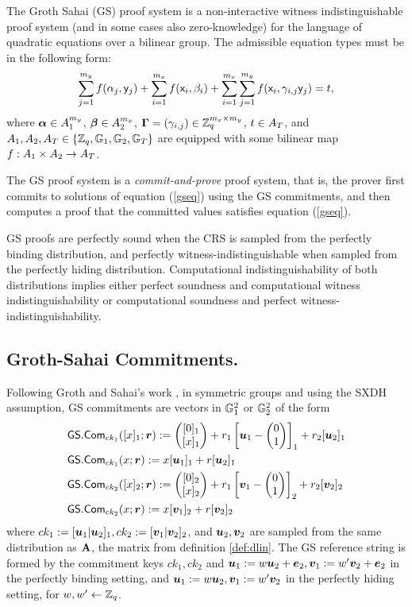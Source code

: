 
The Groth Sahai (GS) proof system is a non-interactive witness indistinguishable proof system (and in some cases also zero-knowledge) for the language of quadratic equations over a bilinear group. The admissible equation types must be in the following form:
\begin{equation}\label{gseq}
\sum_{j=1}^{m_y} f(\alpha_j, \mathsf{y}_j)+\sum_{i=1}^{m_x} f(\mathsf{x}_i, \beta_i)+\sum_{i=1}^{m_x} \sum_{j=1}^{m_y}  f(\mathsf{x}_i,\gamma_{i,j} \mathsf{y}_j)=t,
\end{equation}
 where $\boldsymbol \alpha  \in A_1^{m_y}$, $\boldsymbol \beta  \in A_2^{m_x}$, $\mathbf{{\Gamma}}=(\gamma_{i,j}) \in \mathbb{Z}_q^{m_x\times m_y}$, $t \in A_T$, and $A_1,A_2,A_T\in\{\mathbb{Z}_q,\mathbb{G}_1,\mathbb{G}_2, \mathbb{G}_T\}$ 
are equipped with some bilinear map $f:A_1\times A_2 \rightarrow A_T$.

The GS proof system is a \emph{commit-and-prove} proof system, that is, the prover first commits to solutions
of equation (\ref{gseq}) using the GS commitments, and then computes a proof that the committed values satisfies equation (\ref{gseq}).

GS proofs are perfectly sound when the CRS is sampled from the perfectly binding distribution, and perfectly witness-indistinguishable when sampled from the perfectly hiding distribution. Computational indistinguishability of  both distributions implies either perfect soundness and computational witness indistinguishability or computational soundness and perfect witness-indistinguishability.

\subsection{Groth-Sahai Commitments.}
Following Groth and Sahai's work \cite{EC:GroSah08}, in symmetric groups and using the SXDH assumption, GS commitments are vectors in $\mathbb{G}^2_1$ or $\mathbb{G}_2^2$ of the form
\begin{align*}
&{\mathsf{GS}}.\mathsf{Com}_{ck_1}([x]_1;{\boldsymbol{r}}):=\left(\begin{matrix}{[0]_1}\\{[x]_1}\end{matrix}\right)+r_1\left[{\boldsymbol{u}}_1-\left(\begin{matrix}0\\1\end{matrix}\right)\right]_1+{r}_2[{\boldsymbol{u}}_2]_1\\
&{\mathsf{GS}}.\mathsf{Com}_{ck_1}(x;{\boldsymbol{r}}):=x[{\boldsymbol{u}}_1]_1+{r}[{\boldsymbol{u}}_2]_1\\
& {\mathsf{GS}}.\mathsf{Com}_{ck_2}([x]_2;{\boldsymbol{r}}):=\left(\begin{matrix}{[0]_2}\\{[x]_2}\end{matrix}\right)+r_1\left[{\boldsymbol{v}}_1-\left(\begin{matrix}0\\1\end{matrix}\right)\right]_2+{r}_2[{\boldsymbol{v}}_2]_2\\
&{\mathsf{GS}}.\mathsf{Com}_{ck_2}(x;{\boldsymbol{r}}):=x[{\boldsymbol{v}}_1]_2+{r}[{\boldsymbol{v}}_2]_2
\end{align*}
where $ck_1:=[{\boldsymbol{u}}_1|{\boldsymbol{u}}_2]_1,ck_2:=[{\boldsymbol{v}}_1|{\boldsymbol{v}}_2]_2$, and ${\boldsymbol{u}}_2,{\boldsymbol{v}}_2$ are sampled from the same distribution as $\mathbf{{A}}$, the matrix from definition \ref{def:dlin}. The GS reference string is formed by the commitment keys $ck_1,ck_2$  and ${\boldsymbol{u}}_1:=w{\boldsymbol{u}}_2+{\boldsymbol{e}}_2,{\boldsymbol{v}}_1:=w'{\boldsymbol{v}}_2+{\boldsymbol{e}}_2$ in the perfectly binding setting, and ${\boldsymbol{u}}_1:=w{\boldsymbol{u}}_2,{\boldsymbol{v}}_1:=w'{\boldsymbol{v}}_2$ in the perfectly hiding setting, for $w,w'\gets\mathbb{Z}_q$.

